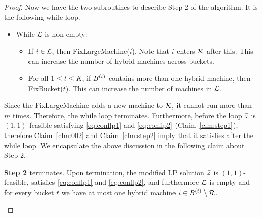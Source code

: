 \begin{proof}
	
%	
%	
Now we have the two subroutines to describe Step 2 of the algorithm. It is the following while loop.
   \begin{itemize}[noitemsep]
   	\item[{}] While ${\cal L}$ is non-empty: 
   	\begin{itemize}[noitemsep]
   		\item If $i\in {\cal L}$, then {\sf FixLargeMachine}($i$). Note that $i$ enters ${\cal R}$ after this. This can increase the number of hybrid machines across buckets.
   		\item For all $1\leq t\leq K$, if $B^{(t)}$ contains more than one hybrid machine, then {\sf FixBucket}($t$). This can increase the number of machines in ${\cal L}$.
   	\end{itemize}
   \end{itemize}

%   
	  Since the {\sf FixLargeMachine} adds a new machine to ${\cal R}$, it cannot run more than $m$ times. Therefore, the while loop terminates. Furthermore, before the loop $\bar z$ is $(1,1)$-feasible satisfying \eqref{eq:conflp1} and \eqref{eq:conflp2} (Claim~\ref{clm:step1}), therefore Claim~\ref{clm:002} and Claim~\ref{clm:step2} imply that it satisfies after the while loop. We encapsulate the above discussion in the following claim about Step 2.
   \begin{claim}\label{clm:003}
   	{\bf Step 2} terminates. Upon termination, the modified LP solution $\bar z$ is $(1,1)$-feasible, satisfies \eqref{eq:conflp1} and \eqref{eq:conflp2}, and furthermore
   	${\cal L}$ is empty and for every bucket $t$ we have at most one hybrid machine $i\in B^{(t)}\setminus{\cal R}$.
   	\end{claim}
   	\smallskip
   	


\end{proof}
